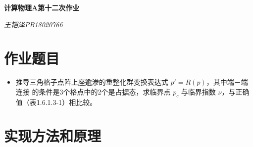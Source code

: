 \documentclass[UTF8]{ctexart}
\begin{document}
	\centering\textbf{\LARGE{计算物理A第十二次作业}}
	
	\textit{王铠泽\qquad PB18020766}
	
		
	\section{作业题目}
	
	\begin{itemize}
	\item	推导三角格子点阵上座逾渗的重整化群变换表达式 $ p' = R(p) $，其中端－端连接
	的条件是3个格点中的2个是占据态，求临界点 $ p_c $ 与临界指数 $ \nu$，与正确值（表1.6.1.3-1）相比较。
	\end{itemize}

	\section{实现方法和原理}
	
\end{document}
